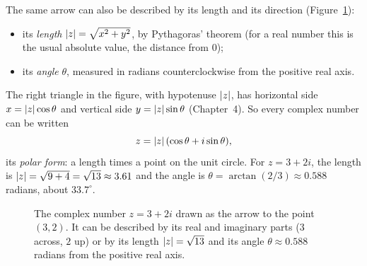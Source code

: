The same arrow can also be described by its length and its direction (Figure~\ref{ch30:fig-complex-plane}):
\begin{itemize}
  \item its \emph{length} $\lvert z\rvert = \sqrt{x^2+y^2}$, by Pythagoras' theorem (for a real number this is the usual absolute value, the distance from $0$);
  \item its \emph{angle} $\theta$, measured in radians counterclockwise from the positive real axis.
\end{itemize}
The right triangle in the figure, with hypotenuse $\lvert z\rvert$, has horizontal side $x = \lvert z\rvert\cos\theta$ and vertical side $y = \lvert z\rvert\sin\theta$ (Chapter~4). So every complex number can be written
\[
  z = \lvert z\rvert\,(\cos\theta + i\sin\theta),
\]
its \emph{polar form}: a length times a point on the unit circle. For $z = 3 + 2i$, the length is $\lvert z\rvert = \sqrt{9 + 4} = \sqrt{13} \approx 3.61$ and the angle is $\theta = \arctan(2/3) \approx 0.588$ radians, about $33.7^\circ$.

\begin{figure}[htbp]
\centering
{}
\caption{The complex number $z = 3 + 2i$ drawn as the arrow to the point $(3,2)$. It can be described by its real and imaginary parts ($3$ across, $2$ up) or by its length $\lvert z\rvert = \sqrt{13}$ and its angle $\theta \approx 0.588$ radians from the positive real axis.}
\label{ch30:fig-complex-plane}
\end{figure}

